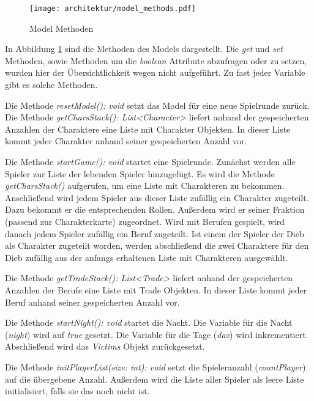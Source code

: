 \begin{figure}[H]
	\centering
	\texttt{[image: architektur/model\_methods.pdf]}
	\caption{Model Methoden}
	\label{figure:model_methods}
\end{figure}

In Abbildung \ref{figure:model_methods} sind die Methoden des Models dargestellt. Die \textit{get} und \textit{set} Methoden, sowie Methoden um die \textit{boolean} Attribute abzufragen oder zu setzen, wurden hier der Übersichtlichkeit wegen nicht aufgeführt. Zu fast jeder Variable gibt es solche Methoden.

\medskip
Die Methode \textit{resetModel(): void} setzt das Model für eine neue Spielrunde zurück. \\
Die Methode \textit{getCharsStack(): List<Character>} liefert anhand der gespeicherten Anzahlen der Charaktere eine Liste mit Charakter Objekten. In dieser Liste kommt jeder Charakter anhand seiner gespeicherten Anzahl vor.

\medskip
Die Methode \textit{startGame(): void} startet eine Spielrunde. Zunächst werden alle Spieler zur Liste der lebenden Spieler hinzugefügt. Es wird die Methode \textit{getCharsStack()} aufgerufen, um eine Liste mit Charakteren zu bekommen.
Anschließend wird jedem Spieler aus dieser Liste zufällig ein Charakter zugeteilt. Dazu bekommt er die entsprechenden Rollen. Außerdem wird er seiner Fraktion (passend zur Charakterkarte) zugeordnet. 
Wird mit Berufen gespielt, wird danach jedem Spieler zufällig ein Beruf zugeteilt. 
Ist einem der Spieler der Dieb als Charakter zugeteilt worden, werden abschließend die zwei Charaktere für den Dieb zufällig aus der anfangs erhaltenen Liste mit Charakteren ausgewählt. 

\medskip
Die Methode \textit{getTradeStack(): List<Trade>} liefert anhand der gespeicherten Anzahlen der Berufe eine Liste mit Trade Objekten. In dieser Liste kommt jeder Beruf anhand seiner gespeicherten Anzahl vor. 

\medskip
Die Methode \textit{startNight(): void} startet die Nacht. Die Variable für die Nacht (\textit{night}) wird auf \textit{true} gesetzt. Die Variable für die Tage (\textit{dax}) wird inkrementiert. Abschließend wird das \textit{Victims} Objekt zurückgesetzt. 

\medskip
Die Methode \textit{initPlayerList(size: int): void} setzt die Spieleranzahl (\textit{countPlayer}) auf die übergebene Anzahl. Außerdem wird die Liste aller Spieler als leere Liste initialisiert, falls sie das noch nicht ist. 

